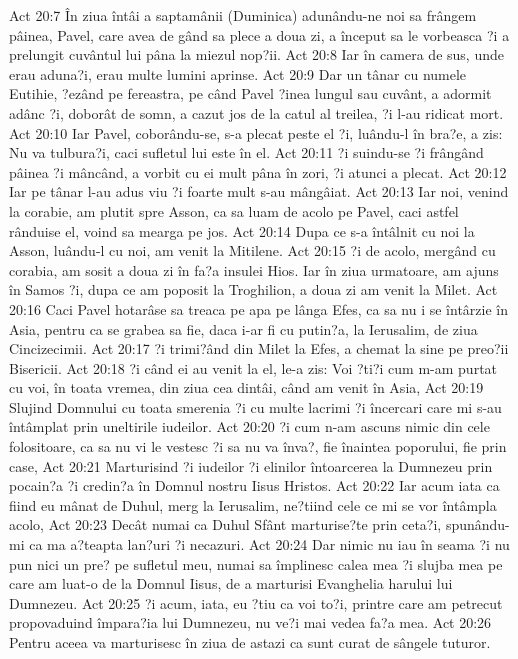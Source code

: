 Act 20:7  În ziua întâi a saptamânii (Duminica) adunându-ne noi sa frângem pâinea, Pavel, care avea de gând sa plece a doua zi, a început sa le vorbeasca ?i a prelungit cuvântul lui pâna la miezul nop?ii.
Act 20:8  Iar în camera de sus, unde erau aduna?i, erau multe lumini aprinse.
Act 20:9  Dar un tânar cu numele Eutihie, ?ezând pe fereastra, pe când Pavel ?inea lungul sau cuvânt, a adormit adânc ?i, doborât de somn, a cazut jos de la catul al treilea, ?i l-au ridicat mort.
Act 20:10  Iar Pavel, coborându-se, s-a plecat peste el ?i, luându-l în bra?e, a zis: Nu va tulbura?i, caci sufletul lui este în el.
Act 20:11  ?i suindu-se ?i frângând pâinea ?i mâncând, a vorbit cu ei mult pâna în zori, ?i atunci a plecat.
Act 20:12  Iar pe tânar l-au adus viu ?i foarte mult s-au mângâiat.
Act 20:13  Iar noi, venind la corabie, am plutit spre Asson, ca sa luam de acolo pe Pavel, caci astfel rânduise el, voind sa mearga pe jos.
Act 20:14  Dupa ce s-a întâlnit cu noi la Asson, luându-l cu noi, am venit la Mitilene.
Act 20:15  ?i de acolo, mergând cu corabia, am sosit a doua zi în fa?a insulei Hios. Iar în ziua urmatoare, am ajuns în Samos ?i, dupa ce am poposit la Troghilion, a doua zi am venit la Milet.
Act 20:16  Caci Pavel hotarâse sa treaca pe apa pe lânga Efes, ca sa nu i se întârzie în Asia, pentru ca se grabea sa fie, daca i-ar fi cu putin?a, la Ierusalim, de ziua Cincizecimii.
Act 20:17  ?i trimi?ând din Milet la Efes, a chemat la sine pe preo?ii Bisericii.
Act 20:18  ?i când ei au venit la el, le-a zis: Voi ?ti?i cum m-am purtat cu voi, în toata vremea, din ziua cea dintâi, când am venit în Asia,
Act 20:19  Slujind Domnului cu toata smerenia ?i cu multe lacrimi ?i încercari care mi s-au întâmplat prin uneltirile iudeilor.
Act 20:20  ?i cum n-am ascuns nimic din cele folositoare, ca sa nu vi le vestesc ?i sa nu va înva?, fie înaintea poporului, fie prin case,
Act 20:21  Marturisind ?i iudeilor ?i elinilor întoarcerea la Dumnezeu prin pocain?a ?i credin?a în Domnul nostru Iisus Hristos.
Act 20:22  Iar acum iata ca fiind eu mânat de Duhul, merg la Ierusalim, ne?tiind cele ce mi se vor întâmpla acolo,
Act 20:23  Decât numai ca Duhul Sfânt marturise?te prin ceta?i, spunându-mi ca ma a?teapta lan?uri ?i necazuri.
Act 20:24  Dar nimic nu iau în seama ?i nu pun nici un pre? pe sufletul meu, numai sa împlinesc calea mea ?i slujba mea pe care am luat-o de la Domnul Iisus, de a marturisi Evanghelia harului lui Dumnezeu.
Act 20:25  ?i acum, iata, eu ?tiu ca voi to?i, printre care am petrecut propovaduind împara?ia lui Dumnezeu, nu ve?i mai vedea fa?a mea.
Act 20:26  Pentru aceea va marturisesc în ziua de astazi ca sunt curat de sângele tuturor.
